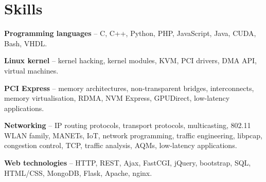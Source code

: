 \section{Skills}
\begin{small}
	\parbox[t][][t]{\linewidth}{
		\textbf{Programming languages} -- C, C++, Python, PHP, JavaScript, Java, CUDA, Bash, VHDL.
		\smallbreak
	}
	\parbox[t][][t]{\linewidth}{
		\textbf{Linux kernel} -- kernel hacking, kernel modules,
		KVM, PCI drivers, DMA API, virtual machines.
		\smallbreak
	}
	\parbox[t][][t]{\linewidth}{
		\textbf{PCI Express} -- memory architectures, non-transparent bridges, 
		interconnects, memory virtualisation, RDMA, NVM Express, GPUDirect,
		low-latency applications.
		\smallbreak
	}
	\parbox[t][][t]{\linewidth}{
		\textbf{Networking} -- IP routing protocols, transport protocols,
		multicasting, 802.11 WLAN family, MANETs, IoT, network programming, 
		traffic engineering, libpcap, congestion control, TCP, traffic
		analysis, AQMs, low-latency applications.
		\smallbreak
	}
	\parbox[t][][t]{\linewidth}{
		\textbf{Web technologies} -- HTTP, REST, Ajax, FastCGI, jQuery,
		bootstrap, SQL, HTML/CSS, MongoDB, Flask, Apache, nginx.
		\smallbreak
	}
\end{small}

